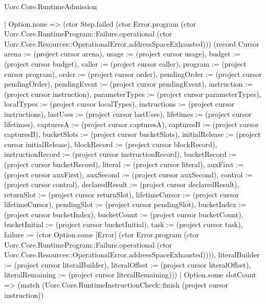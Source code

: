 \begin{lexlean}{Uorc.Core.RuntimeAdmission}
\begin{semanticmodule}
{        | Option.none => (ctor Step.failed (ctor Error.program (ctor Uorc.Core.RuntimeProgram::Failure.operational (ctor Uorc.Core.Resources::OperationalError.addressSpaceExhausted))) (record Cursor {arena := (project cursor arena), usage := (project cursor usage), budget := (project cursor budget), caller := (project cursor caller), program := (project cursor program), order := (project cursor order), pendingOrder := (project cursor pendingOrder), pendingEvent := (project cursor pendingEvent), instruction := (project cursor instruction), parameterTypes := (project cursor parameterTypes), localTypes := (project cursor localTypes), instructions := (project cursor instructions), lastUses := (project cursor lastUses), lifetimes := (project cursor lifetimes), capturesA := (project cursor capturesA), capturesB := (project cursor capturesB), bucketSlots := (project cursor bucketSlots), initialRelease := (project cursor initialRelease), blockRecord := (project cursor blockRecord), instructionRecord := (project cursor instructionRecord), bucketRecord := (project cursor bucketRecord), literal := (project cursor literal), auxFirst := (project cursor auxFirst), auxSecond := (project cursor auxSecond), control := (project cursor control), declaredResult := (project cursor declaredResult), returnSlot := (project cursor returnSlot), lifetimeCursor := (project cursor lifetimeCursor), pendingSlot := (project cursor pendingSlot), bucketIndex := (project cursor bucketIndex), bucketCount := (project cursor bucketCount), bucketInitial := (project cursor bucketInitial), task := (project cursor task), failure := (ctor Option.some [Error] (ctor Error.program (ctor Uorc.Core.RuntimeProgram::Failure.operational (ctor Uorc.Core.Resources::OperationalError.addressSpaceExhausted)))), literalBuilder := (project cursor literalBuilder), literalOffset := (project cursor literalOffset), literalRemaining := (project cursor literalRemaining)}))
        | Option.some slotCount => (match (Uorc.Core.RuntimeInstructionCheck::finish (project cursor instruction))
}
\end{semanticmodule}
\end{lexlean}

